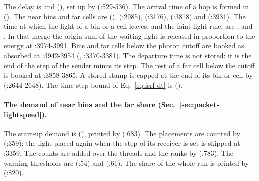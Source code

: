 The delay is
 and
(), set up by
 (:529-536). The arrival time of a
hop is formed in 
(). The near bins and far cells are
 (),
 (:2985), 
(:3176),  (:3818) and
 (:3931). The time at which the
light of a bin or a cell leaves, and the faint-light rule, are
, 
and . In that merge the origin
sum of the waiting light is released in proportion to the energy at
:3974-3991. Bins and far cells below the photon cutoff are booked as absorbed
at :3942-3954 (, :3370-3381).
The departure time is not stored: it is the end of the step of the sender minus its step. The rest of a far cell below the cutoff is
booked at :3858-3865. A stored stamp is capped at the end of its bin or cell
by  (:2644-2648). The time-step bound of
Eq.~\eqref{eq:isrf-dt} is 
().

\paragraph{The demand of near bins and the far share (Sec.~\ref{sec:packet-lightspeed}).}
The start-up demand is 
(), printed by
 (:683). The placements are
counted by  (:359); the light placed again
when the step of its receiver is set is skipped at :3359. The counts are added
over the threads and the ranks by 
(:783). The warning thresholds are 
(:54) and  (:61). The share
of the whole run is printed by 
(:820).

